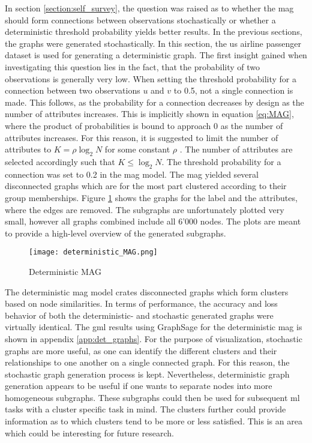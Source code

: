   In section \ref{section:self_survey}, the question was raised 
  as to whether the \acs{mag} should form connections between observations
  stochastically or whether a deterministic threshold probability yields better 
  results. In the previous sections, the graphs were generated stochastically.
  In this section, the \acs{us} airline passenger dataset is used for 
  generating a deterministic graph. The first insight gained when investigating 
  this question lies in the fact, that the probability of two observations is 
  generally very low. When setting the threshold probability for a connection 
  between two observations $u$ and $v$ to 0.5, not a single connection is made. 
  This follows, as the probability for a connection decreases by design as the 
  number of attributes increases. This is implicitly shown in equation 
  \ref{eq:MAG}, where the product of probabilities is bound to approach 0 as
  the number of attributes increases. For this reason, it is suggested to limit 
  the number of attributes to $K=\rho\log_{2}N$ for some constant $\rho$ 
  \citep[p. 122]{kim2012multiplicative}. The number of attributes are selected 
  accordingly such that $K\leqslant\log_{2} N$. The threshold probability for a 
  connection was set to 0.2 in the \acs{mag} model. The \acs{mag} yielded 
  several disconnected graphs which are for the most part clustered according to 
  their group memberships. Figure \ref{fig:det_MAG} shows the graphs for the 
  label and the attributes, where the edges are removed. The subgraphs are 
  unfortunately plotted very small, however all graphs combined include all 
  6'000 nodes. The plots are meant to provide a high-level overview of the 
  generated subgraphs. 

  \begin{figure}[h]
		\centering
		\texttt{[image: deterministic\_MAG.png]}
		\caption{Deterministic MAG}
        \label{fig:det_MAG}
  \end{figure}

  \noindent The deterministic \acs{mag} model crates disconnected graphs which 
  form clusters based on node similarities. In terms of performance, the accuracy 
  and loss behavior of both the deterministic- and stochastic generated graphs 
  were virtually identical. The \acs{gml} results using GraphSage for the
  deterministic \acs{mag} is shown in appendix \ref{app:det_graphs}. For the 
  purpose of visualization, stochastic graphs are more useful, as one can 
  identify the different clusters and their relationships to one another on a 
  single connected graph. For this reason, the stochastic graph generation 
  process is kept. Nevertheless, deterministic graph generation appears to be 
  useful if one wants to separate nodes into more homogeneous subgraphs. These 
  subgraphs could then be used for subsequent \acs{ml} tasks with a cluster 
  specific task in mind. The clusters further could provide information as to 
  which clusters tend to be more or less satisfied. This is an area which could 
  be interesting for future research.
  
